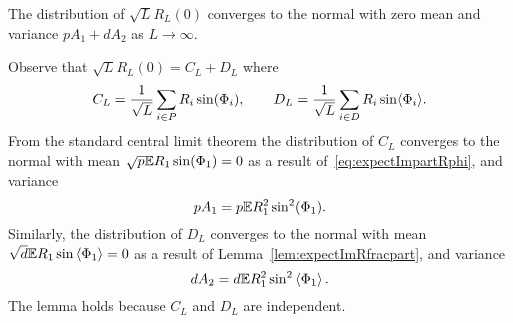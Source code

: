\documentclass[journal]{IEEEtran}
\begin{document}
\begin{lemma}\label{lem:convdistGLdash}
The distribution of $\sqrt{L}R_L(0)$ converges to the normal with zero mean and variance $pA_1 + dA_2$ as $L\rightarrow\infty$.
\end{lemma}
\begin{IEEEproof}
Observe that $\sqrt{L} R_L(0) = C_L + D_L$ where
\[
C_L = \frac{1}{\sqrt{L}} \sum_{i \in P} R_i \sin(\Phi_i), \qquad D_L = \frac{1}{\sqrt{L}} \sum_{i \in D} R_i \sin\langle \Phi_i \rangle.
\]
From the standard central limit theorem the distribution of $C_L$ converges to the normal with mean $\sqrt{p}{\mathbb E} R_1 \sin(\Phi_1) = 0$ as a result of~\eqref{eq:expectImpartRphi}, and variance
\[
p A_1 = p {\mathbb E} R_1^2 \sin^2(\Phi_1).
\]
Similarly, the distribution of $D_L$ converges to the normal with mean $\sqrt{d}{\mathbb E} R_1 \sin\left\langle \Phi_1 \right\rangle = 0$ as a result of Lemma~\ref{lem:expectImRfracpart}, and variance
\[
d A_2 = d {\mathbb E} R_1^2 \sin^2\left\langle \Phi_1 \right\rangle.
\]
The lemma holds because $C_L$ and $D_L$ are independent. 
\end{IEEEproof}
\end{document}
